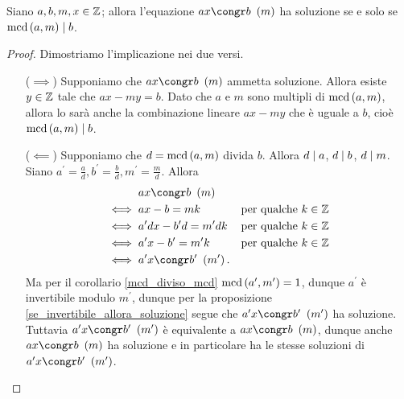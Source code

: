 \begin{proposition} \label{cong_ha_soluzione_sse_mcd_div_b}
    Siano $a, b, m, x \in \mathbb{Z}$; allora l'equazione $ax \congr b \Mod{m}$ ha soluzione se e solo se $\operatorname{mcd}\left(a, m\right) \mid b$.
\end{proposition}
\begin{proof}
    Dimostriamo l'implicazione nei due versi.
    \begin{itemize}
        \item[($\implies$)] Supponiamo che $ax \congr b \Mod{m}$ ammetta soluzione. Allora esiste $y \in \mathbb{Z}$ tale che $ax - my = b$. Dato che $a$ e $m$ sono multipli di $\operatorname{mcd}\left(a, m\right)$, allora lo sarà anche la combinazione lineare $ax - my$ che è uguale a $b$, cioè $\operatorname{mcd}\left(a, m\right) \mid b$.
        \item[($\impliedby$)] Supponiamo che $d = \operatorname{mcd}\left(a, m\right)$ divida $b$. Allora $d\mid a$, $d \mid b$, $d \mid m$. Siano $a^\prime = \frac{a}{d}, b^\prime = \frac{b}{d}, m^\prime = \frac{m}{d}$. Allora 
        \begin{align*}
            &ax \congr b \Mod{m}\\
            \iff{} &ax - b = mk   &\text{per qualche $k \in \Z$} \\
            \iff{} &a^\prime dx - b^\prime d = m^\prime dk &\text{per qualche $k \in \Z$} \\
            \iff{} &a^\prime x - b^\prime = m^\prime k &\text{per qualche $k \in \Z$} \\
            \iff{} &a^\prime x \congr b^\prime \Mod{m^\prime }.
        \end{align*}
        Ma per il corollario \ref{mcd_diviso_mcd} $\operatorname{mcd}\left(a^\prime, m^\prime\right) = 1$, dunque $a^\prime$ è invertibile modulo $m^\prime$, dunque per la proposizione \ref{se_invertibile_allora_soluzione} segue che $a^\prime x \congr b^\prime \Mod{m^\prime}$ ha soluzione. Tuttavia $a^\prime x \congr b^\prime \Mod{m^\prime}$ è equivalente a $ax \congr b \Mod{m}$, dunque anche $ax \congr b \Mod{m}$ ha soluzione e in particolare ha le stesse soluzioni di $a^\prime x \congr b^\prime \Mod{m^\prime}$. \qedhere
    \end{itemize}
\end{proof}


